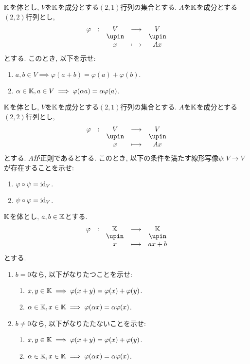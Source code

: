\begin{quiz}
  $\mathbb{K}$を体とし, $V$を$\mathbb{K}$を成分とする$(2,1)$行列の集合とする.
  $A$を$\mathbb{K}$を成分とする$(2,2)$行列とし,
  \begin{align*}
    \shazo{\varphi}{V}{V}{x}{Ax}
  \end{align*}
  とする.
  このとき, 以下を示せ:
  \begin{enumerate}
    \item $a,b\in V\implies \varphi(a+b)=\varphi(a)+\varphi(b)$.
    \item $\alpha\in\mathbb{K}, a\in V\implies \varphi(\alpha a)=\alpha\varphi(a)$.
  \end{enumerate}
\end{quiz}

\begin{quiz}
  $\mathbb{K}$を体とし, $V$を$\mathbb{K}$を成分とする$(2,1)$行列の集合とする.
  $A$を$\mathbb{K}$を成分とする$(2,2)$行列とし,
  \begin{align*}
    \shazo{\varphi}{V}{V}{x}{Ax}
  \end{align*}
  とする. $A$が正則であるとする.
  このとき, 以下の条件を満たす線形写像$\psi\colon V\to V$が存在することを示せ:
  \begin{enumerate}
    \item $\varphi\circ \psi=\operatorname{id}_V$.
    \item $\psi\circ \varphi=\operatorname{id}_V$.
  \end{enumerate}
\end{quiz}

\begin{quiz}
  $\mathbb{K}$を体とし, $a, b\in \mathbb{K}$とする.
  \begin{align*}
    \shazo{\varphi}{\KK}{\KK}{x}{ax+b}
  \end{align*}
  とする.
  \begin{enumerate}
  \item
  $b=0$なら, 以下がなりたつことを示せ:
  \begin{enumerate}
    \item $x,y\in \mathbb{K}\implies \varphi(x+y)=\varphi(x)+\varphi(y)$.
    \item $\alpha\in\mathbb{K}, x\in \mathbb{K}\implies \varphi(\alpha x)=\alpha\varphi(x)$.
  \end{enumerate}
  \item
  $b\neq 0$なら, 以下がなりたたないことを示せ:
  \begin{enumerate}
    \item $x,y\in \mathbb{K}\implies \varphi(x+y)=\varphi(x)+\varphi(y)$.
    \item $\alpha\in\mathbb{K}, x\in \mathbb{K}\implies \varphi(\alpha x)=\alpha\varphi(x)$.
  \end{enumerate}
  \end{enumerate}
\end{quiz}


